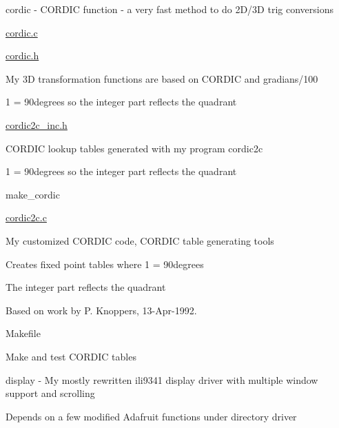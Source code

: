 \begin{DoxyItemize}
\item cordic -\/ C\+O\+R\+D\+IC function -\/ a very fast method to do 2\+D/3D trig conversions
\begin{DoxyItemize}
\item \hyperlink{cordic_8c}{cordic.\+c}
\item \hyperlink{cordic_8h}{cordic.\+h}
\begin{DoxyItemize}
\item My 3D transformation functions are based on C\+O\+R\+D\+IC and gradians/100
\item 1 = 90degrees so the integer part reflects the quadrant
\end{DoxyItemize}
\item \hyperlink{cordic2c__inc_8h}{cordic2c\+\_\+inc.\+h}
\begin{DoxyItemize}
\item C\+O\+R\+D\+IC lookup tables generated with my program cordic2c
\item 1 = 90degrees so the integer part reflects the quadrant
\end{DoxyItemize}
\item make\+\_\+cordic
\begin{DoxyItemize}
\item \hyperlink{cordic2c_8c}{cordic2c.\+c}
\begin{DoxyItemize}
\item My customized C\+O\+R\+D\+IC code, C\+O\+R\+D\+IC table generating tools
\item Creates fixed point tables where 1 = 90degrees
\begin{DoxyItemize}
\item The integer part reflects the quadrant
\end{DoxyItemize}
\item Based on work by P. Knoppers, 13-\/\+Apr-\/1992.
\end{DoxyItemize}
\item Makefile
\begin{DoxyItemize}
\item Make and test C\+O\+R\+D\+IC tables
\end{DoxyItemize}
\end{DoxyItemize}
\end{DoxyItemize}
\item display -\/ My mostly rewritten ili9341 display driver with multiple window support and scrolling
\begin{DoxyItemize}
\item Depends on a few modified Adafruit functions under directory driver

\end{DoxyItemize}
\end{DoxyItemize}
